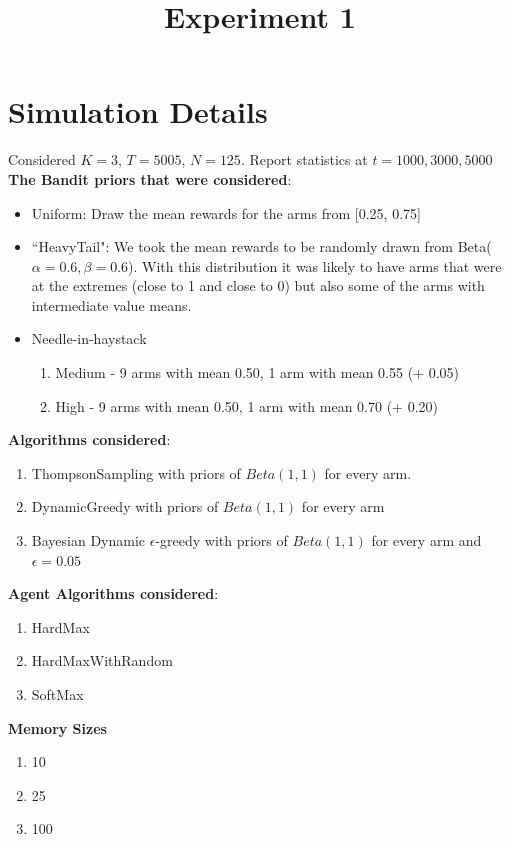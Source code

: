 \documentclass[11pt,letterpaper]{article}
\begin{document}
 

\title{Experiment 1}
\maketitle

\section*{Simulation Details}

Considered $K = 3$, $T = 5005$, $N = 125$. Report statistics at $t = 1000, 3000, 5000$ \\
\textbf{The Bandit priors that were considered}:
\begin{itemize}
\item Uniform: Draw the mean rewards for the arms from [0.25, 0.75]
\item ``HeavyTail": We took the mean rewards to be randomly drawn from Beta($\alpha=0.6,\beta=0.6$). With this distribution it was likely to have arms that were at the extremes (close to 1 and close to 0) but also some of the arms with intermediate value means.
\item Needle-in-haystack
\begin{enumerate}
\item Medium - 9 arms with mean 0.50, 1 arm with mean 0.55 (+ 0.05)
\item High - 9 arms with mean 0.50, 1 arm with mean 0.70 (+ 0.20)
\end{enumerate}
\end{itemize}
\textbf{Algorithms considered}:
\begin{enumerate}
\item ThompsonSampling with priors of $Beta(1, 1)$ for every arm.
\item DynamicGreedy with priors of $Beta(1, 1)$ for every arm
\item Bayesian Dynamic $\epsilon$-greedy with priors of $Beta(1, 1)$ for every arm and $\epsilon=0.05$
\end{enumerate}
\textbf{Agent Algorithms considered}:
\begin{enumerate}
\item HardMax
\item HardMaxWithRandom
\item SoftMax
\end{enumerate}
\textbf{Memory Sizes}
\begin{enumerate}
\item 10
\item 25
\item 100
\end{enumerate}
\end{document}
